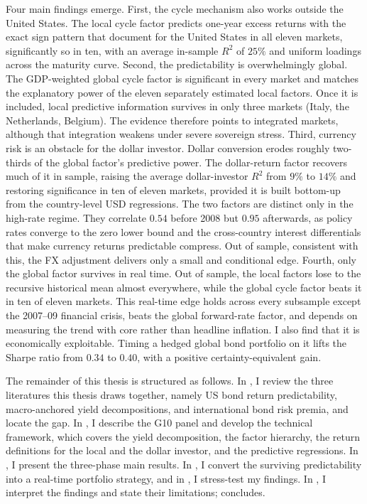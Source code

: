 Four main findings emerge. First, the cycle mechanism
also works outside the United States. The local cycle factor predicts
one-year excess returns with the exact sign pattern that \citet{cieslak2015}
document for the United States in all eleven markets, significantly so in
ten, with an average in-sample $R^{2}$ of $25\%$ and uniform loadings across the maturity curve.
Second, the predictability is overwhelmingly global. The
GDP-weighted global cycle factor is significant in every market and matches
the explanatory power of the eleven separately estimated local factors.
Once it is included, local predictive information survives in only
three markets
(Italy, the Netherlands, Belgium). The evidence therefore points to integrated
markets, although that integration weakens under severe sovereign stress. Third, currency risk is an obstacle for the dollar investor. Dollar
conversion erodes roughly two-thirds of the global factor's predictive
power. The dollar-return factor recovers much of it in sample, raising
the average dollar-investor $R^{2}$ from $9\%$ to $14\%$ and restoring
significance in ten of eleven markets, provided it is built bottom-up from
the country-level USD regressions. The two factors are distinct only in the high-rate regime. They correlate $0.54$ before 2008 but
$0.95$ afterwards, as policy rates converge to the zero lower bound and the
cross-country interest differentials that make currency returns predictable
compress. Out of sample, consistent with this, the
FX adjustment delivers only a small and conditional edge. Fourth, only
the global factor survives in real time. Out of sample, the local factors
lose to the recursive historical mean almost everywhere, while the global
cycle factor beats it in ten of eleven markets. This real-time edge holds
across every subsample except the 2007--09 financial crisis, beats the global
forward-rate factor, and depends on measuring the trend with core rather than
headline inflation. I also find that it is economically exploitable. Timing a hedged
global bond portfolio on it lifts the Sharpe ratio from $0.34$ to $0.40$,
with a positive certainty-equivalent gain.

The remainder of this thesis is structured as follows. In
, I review the three literatures this thesis draws
together, namely US bond return predictability, macro-anchored yield
decompositions, and international bond risk premia, and locate the gap. In
, I describe the G10 panel and develop the technical framework,
which covers the yield decomposition, the factor hierarchy, the return
definitions for the local and the dollar investor, and the predictive
regressions. In ,
I present the three-phase main results. In , I convert
the surviving predictability into a real-time portfolio strategy, and in
, I stress-test my findings. In ,
I interpret the findings and state their limitations; 
concludes.
